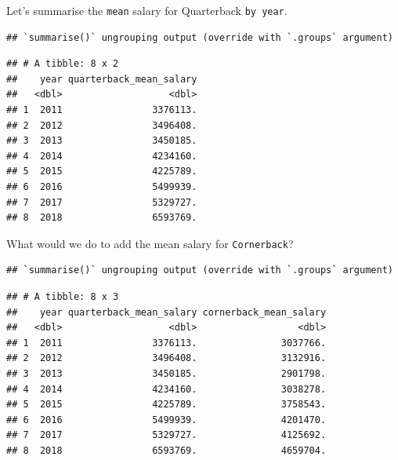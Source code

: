 \documentclass[
]{book}
\newenvironment{Shaded}{\begin{snugshade}}{\end{snugshade}}
\newcommand{\DataTypeTok}[1]{\textcolor[rgb]{0.13,0.29,0.53}{#1}}
\newcommand{\KeywordTok}[1]{\textcolor[rgb]{0.13,0.29,0.53}{\textbf{#1}}}
\newcommand{\NormalTok}[1]{#1}
\newcommand{\OperatorTok}[1]{\textcolor[rgb]{0.81,0.36,0.00}{\textbf{#1}}}
\newcommand{\OtherTok}[1]{\textcolor[rgb]{0.56,0.35,0.01}{#1}}
\newcommand{\StringTok}[1]{\textcolor[rgb]{0.31,0.60,0.02}{#1}}
\begin{document}
Let's summarise the \texttt{mean} salary for Quarterback \texttt{by\ year}.

\begin{Shaded}
\end{Shaded}

\begin{verbatim}
## `summarise()` ungrouping output (override with `.groups` argument)
\end{verbatim}

\begin{verbatim}
## # A tibble: 8 x 2
##    year quarterback_mean_salary
##   <dbl>                   <dbl>
## 1  2011                3376113.
## 2  2012                3496408.
## 3  2013                3450185.
## 4  2014                4234160.
## 5  2015                4225789.
## 6  2016                5499939.
## 7  2017                5329727.
## 8  2018                6593769.
\end{verbatim}

What would we do to add the mean salary for \texttt{Cornerback}?

\begin{Shaded}
\end{Shaded}

\begin{verbatim}
## `summarise()` ungrouping output (override with `.groups` argument)
\end{verbatim}

\begin{verbatim}
## # A tibble: 8 x 3
##    year quarterback_mean_salary cornerback_mean_salary
##   <dbl>                   <dbl>                  <dbl>
## 1  2011                3376113.               3037766.
## 2  2012                3496408.               3132916.
## 3  2013                3450185.               2901798.
## 4  2014                4234160.               3038278.
## 5  2015                4225789.               3758543.
## 6  2016                5499939.               4201470.
## 7  2017                5329727.               4125692.
## 8  2018                6593769.               4659704.
\end{verbatim}
\end{document}
